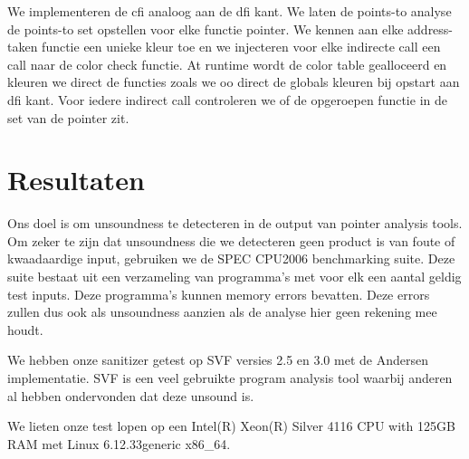 \documentclass[conference]{IEEEtran}
\begin{document}
We implementeren de \gls{cfi} analoog aan de \gls{dfi} kant. We laten de points-to analyse de points-to set opstellen voor elke functie pointer. We kennen aan elke address-taken functie een unieke kleur toe en we injecteren voor elke indirecte call een call naar de color check functie. At runtime wordt de color table gealloceerd en kleuren we direct de functies zoals we oo direct de globals kleuren bij opstart aan \gls{dfi} kant. Voor iedere indirect call controleren we of de opgeroepen functie in de set van de pointer zit. 

\section{Resultaten} 

Ons doel is om unsoundness te detecteren in de output van pointer analysis tools. Om zeker te zijn dat unsoundness die we detecteren geen product is van foute of kwaadaardige input, gebruiken we de SPEC CPU2006 benchmarking suite. Deze suite bestaat uit een verzameling van programma's met voor elk een aantal geldig test inputs. Deze programma's kunnen memory errors bevatten. Deze errors zullen dus ook als unsoundness aanzien als de analyse hier geen rekening mee houdt. 

We hebben onze sanitizer getest op SVF versies 2.5 en 3.0 met de Andersen implementatie. SVF is een veel gebruikte program analysis tool\cite{kasten_integrating_2024}\cite{guo_bulkhead_2025}\cite{huang_taming_2022} waarbij anderen al hebben ondervonden dat deze unsound is\cite{kasten_integrating_2024}. 

We lieten onze test lopen op een Intel(R) Xeon(R) Silver 4116 CPU with 125GB RAM met Linux 6.12.33\-generic x86\_64.
\end{document}
